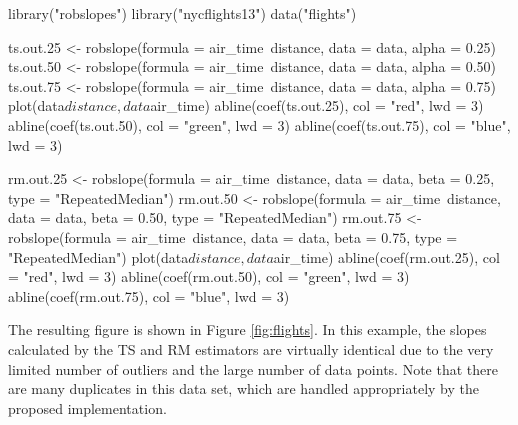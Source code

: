 \begin{example}
library("robslopes")
library("nycflights13")
data("flights")

ts.out.25 <- robslope(formula = air_time~distance, data = data, alpha = 0.25)
ts.out.50 <- robslope(formula = air_time~distance, data = data, alpha = 0.50)
ts.out.75 <- robslope(formula = air_time~distance, data = data, alpha = 0.75)
plot(data$distance, data$air_time)
abline(coef(ts.out.25), col = "red", lwd = 3)
abline(coef(ts.out.50), col = "green", lwd = 3)
abline(coef(ts.out.75), col = "blue", lwd = 3)

rm.out.25 <- robslope(formula = air_time~distance, data = data, beta = 0.25,
                      type = "RepeatedMedian")
rm.out.50 <- robslope(formula = air_time~distance, data = data, beta = 0.50,
                      type = "RepeatedMedian")
rm.out.75 <- robslope(formula = air_time~distance, data = data, beta = 0.75,
                      type = "RepeatedMedian")
plot(data$distance, data$air_time)
abline(coef(rm.out.25), col = "red", lwd = 3)
abline(coef(rm.out.50), col = "green", lwd = 3)
abline(coef(rm.out.75), col = "blue", lwd = 3)

\end{example}
%
%

The resulting figure is shown in Figure \ref{fig:flights}. In this example, the slopes calculated by the TS and RM estimators are virtually identical due to the very limited number of outliers and the large number of data points. Note that there are many duplicates in this data set, which are handled appropriately by the proposed implementation. 

